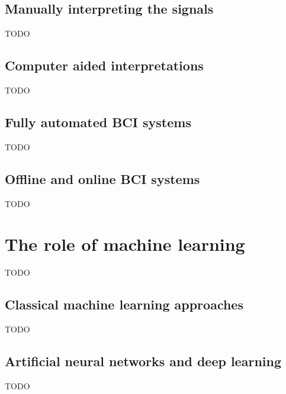 
\subsection{Manually interpreting the signals}
\label{subsec:processing_signals_interpreting_manual}
TODO



\subsection{Computer aided interpretations}
\label{subsec:processing_signals_interpreting_pc_aided}
TODO


\subsection{Fully automated BCI systems}
\label{subsec:processing_signals_interpreting_automated}
TODO


\subsection{Offline and online BCI systems}
\label{subsec:processing_signals_interpreting_offline_online}
TODO


\section{The role of machine learning}
\label{sec:processing_signals_interpreting_ml}
TODO


\subsection{Classical machine learning approaches}
\label{subsec:processing_signals_interpreting_ml_classic}
TODO


\subsection{Artificial neural networks and deep learning}
\label{subsec:processing_signals_interpreting_ml_ann_dl}
TODO


